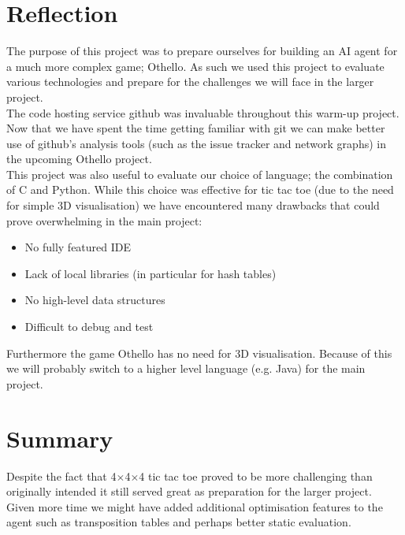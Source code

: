 \documentclass[10pt,twocolumn]{article}
\begin{document}
\section{Reflection}
The purpose of this project was to prepare ourselves for building an AI agent for
a much more complex game; Othello. As such we used this project to evaluate various
technologies and prepare for the challenges we will face in the larger project.\\
The code hosting service github was invaluable throughout this warm-up
project. Now that we have spent the time getting familiar with git
we can make better use of github's analysis tools (such as
the issue tracker and network graphs) in the upcoming Othello project.\\
This project was also useful to evaluate our choice of language; the combination
of C and Python. While this choice was effective for tic tac toe (due to the
need for simple 3D visualisation) we have encountered many drawbacks that 
could prove overwhelming in the main project:
\begin{itemize}
\item No fully featured IDE
\item Lack of local libraries (in particular for hash tables)
\item No high-level data structures
\item Difficult to debug and test
\end{itemize}
Furthermore the game Othello has no need for 3D visualisation. Because of this
we will probably switch to a higher level language (e.g. Java) for the main
project.

\section{Summary}
Despite the fact that 4$\times$4$\times$4 tic tac toe proved to be more challenging
than originally intended it still served great as preparation for the larger project.\\
Given more time we might have added additional optimisation features to the agent such as
transposition tables and perhaps better static evaluation.




\end{document}
